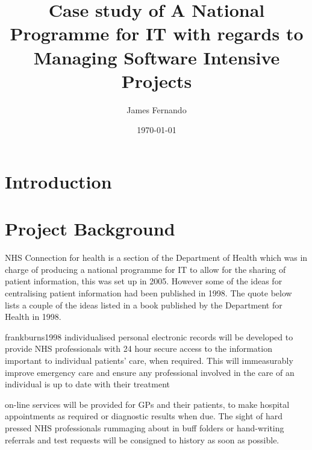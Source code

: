 \documentclass[a4paper,12pt]{scrartcl}
\title{Case study of A National Programme for IT with regards to Managing Software Intensive Projects}
\author{James Fernando}
\date{\today}
\begin{document}
	
	\begin{titlepage}
		\maketitle
	\end{titlepage}
	
	\tableofcontents
	\newpage
	\section{Introduction}
	{
		
	}
	\section{Project Background}
	{
		NHS Connection for health is a section of the Department of Health which was in charge of producing a national programme for IT to allow for the sharing of patient information, this was set up in 2005\cite{nhsconnectingforhealth2019}. However some of the ideas for centralising patient information had been published in 1998. The quote below lists a couple of the ideas listed in a book published by the Department for Health in 1998.
		\begin{displayquote}{frankburns1998}
			\label{qoute:ConnectingForHealthPlans}
			individualised personal electronic records will be developed to provide NHS
			professionals with 24 hour secure access to the information important to
			individual patients’ care, when required. This will immeasurably improve
			emergency care and ensure any professional involved in the care of an
			individual is up to date with their treatment
			
			on-line services will be provided for GPs and their patients, to make hospital
			appointments as required or diagnostic results when due. The sight of hard
			pressed NHS professionals rummaging about in buff folders or hand-writing
			referrals and test requests will be consigned to history as soon as possible.
		\end{displayquote}
	}
\end{document}
